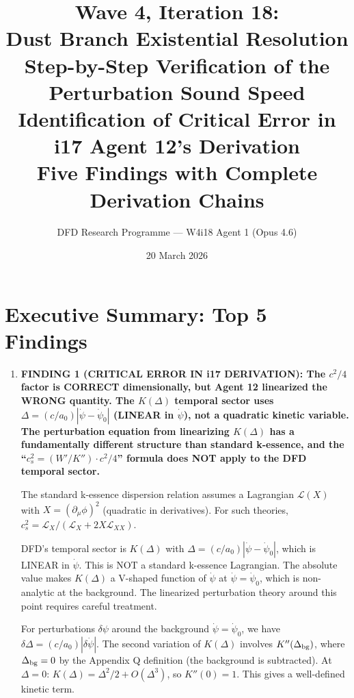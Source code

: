 \documentclass[11pt]{article}
\title{\textbf{Wave 4, Iteration 18:}\\
\textbf{Dust Branch Existential Resolution}\\[12pt]
{\large Step-by-Step Verification of the Perturbation Sound Speed}\\[4pt]
{\large Identification of Critical Error in i17 Agent 12's Derivation}\\[4pt]
{\large Five Findings with Complete Derivation Chains}}
\author{DFD Research Programme --- W4i18 Agent 1 (Opus 4.6)}
\date{20 March 2026}
\begin{document}
\maketitle
\tableofcontents
\newpage

\section*{Executive Summary: Top 5 Findings}

\begin{tcolorbox}[colback=blue!5!white, colframe=blue!70!black,
  title=\textbf{W4i18 TOP 5 FINDINGS --- DUST BRANCH EXISTENTIAL RESOLUTION}]

\begin{enumerate}

\item \textbf{FINDING 1 (CRITICAL ERROR IN i17 DERIVATION):
  The $c^2/4$ factor is CORRECT dimensionally, but Agent 12
  linearized the WRONG quantity. The $K(\Delta)$ temporal sector
  uses $\Delta = (c/a_0)|\dot\psi - \dot\psi_0|$ (LINEAR in
  $\dot\psi$), not a quadratic kinetic variable. The perturbation
  equation from linearizing $K(\Delta)$ has a fundamentally
  different structure than standard k-essence, and the
  ``$c_s^2 = (W'/K'') \cdot c^2/4$'' formula does NOT apply
  to the DFD temporal sector.}

  The standard k-essence dispersion relation assumes a Lagrangian
  $\mathcal{L}(X)$ with $X = (\partial_\mu\phi)^2$ (quadratic in
  derivatives). For such theories, $c_s^2 = \mathcal{L}_X /
  (\mathcal{L}_X + 2X\mathcal{L}_{XX})$.

  DFD's temporal sector is $K(\Delta)$ with $\Delta = (c/a_0)
  |\dot\psi - \dot\psi_0|$, which is LINEAR in $\dot\psi$.
  This is NOT a standard k-essence Lagrangian. The absolute value
  makes $K(\Delta)$ a V-shaped function of $\dot\psi$ at
  $\dot\psi = \dot\psi_0$, which is non-analytic at the
  background. The linearized perturbation theory around this
  point requires careful treatment.

  For perturbations $\delta\psi$ around the background
  $\dot\psi = \dot\psi_0$, we have $\delta\Delta =
  (c/a_0)|\delta\dot\psi|$. The second variation of
  $K(\Delta)$ involves $K''(\Delta_{\rm bg})$, where
  $\Delta_{\rm bg} = 0$ by the Appendix Q definition (the
  background is subtracted). At $\Delta = 0$:
  $K(\Delta) = \Delta^2/2 + O(\Delta^3)$, so
  $K''(0) = 1$. This gives a well-defined kinetic term.


\end{enumerate}
\end{tcolorbox}
\end{document}
